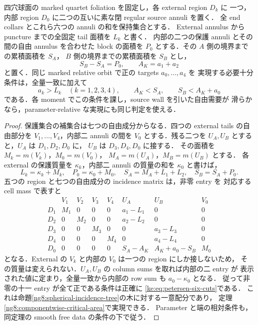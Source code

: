 \begin{proposition}
\label{ke:petersen-two-end-cuts}
四穴球面の marked quartet foliation を固定し，各 external region $D_k$ に
一つ，内部 region $D_0$ に二つの互いに素な閉 regular source annuli を置く．
全 end collars とこれら六つの annuli の和を保持集合とする．
External annulus から puncture までの全固定 tail 面積を $L_k$ と書く．
内部の二つの保護 annuli とその間の自由 annulus を合わせた block の面積を
$P_0$ とする．その $A$ 側の境界までの累積面積を $S_A$，
$B$ 側の境界までの累積面積を $S_B$ とし，
\[
 S_B-S_A=P_0,\qquad A_K=a_1+a_2
\]
と置く．同じ marked relative orbit で正の targets $a_0,\ldots,a_4$ を
実現する必要十分条件は，全量一致に加えて
\begin{equation}\label{ke:eq:petersen-six-cuts}
 a_k>L_k\quad(k=1,2,3,4),\qquad
 A_K<S_A,\qquad S_B<A_K+a_0
\end{equation}
である．各 moment でこの条件を課し，source wall を引いた自由需要が
滑らかなら，parameter-relative な実現にも同じ判定を使える．
\end{proposition}

\begin{proof}
保護集合の補集合は七つの自由成分からなる．四つの external tails の自由部分を
$V_1,\ldots,V_4$，内部二 annuli の間を $V_0$ とする．残る二つを
$U_A,U_B$ とすると，$U_A$ は $D_1,D_2,D_0$ に，
$U_B$ は $D_3,D_4,D_0$ に接する．
その面積を $M_k=m(V_k)$，$M_0=m(V_0)$，
$M_A=m(U_A)$，$M_B=m(U_B)$ とする．
各 external の保護質量を $\kappa_k$，内部二 annuli の質量の和を
$\kappa_0$ と書けば，
\[
 L_k=\kappa_k+M_k,\quad P_0=\kappa_0+M_0,\quad
 S_A=M_A+L_1+L_2,\quad S_B=S_A+P_0 .
\]
五つの region と七つの自由成分の incidence matrix は，非零 entry を
対応する cell mass で表すと
\[
\begin{array}{c|ccccccc}
 &V_1&V_2&V_3&V_4&U_A&U_B&V_0\\ \hline
 D_1&M_1&0&0&0&a_1-L_1&0&0\\
 D_2&0&M_2&0&0&a_2-L_2&0&0\\
 D_3&0&0&M_3&0&0&a_3-L_3&0\\
 D_4&0&0&0&M_4&0&a_4-L_4&0\\
 D_0&0&0&0&0&S_A-A_K&A_K+a_0-S_B&M_0
\end{array}
\]
となる．External の $V_k$ と内部の $V_0$ は一つの region にしか接しないため，
その質量は変えられない．$U_A,U_B$ の column sums を取れば内部の二 entry が
表示された値に定まり，全量一致から内部の row sum も $a_0-\kappa_0$ となる．
従って非零の十一 entry が全て正である条件は正確に
\eqref{ke:eq:petersen-six-cuts}である．
これは命題\ref{ng8:spherical-incidence-tree}の木に対する一意配分であり，
定理\ref{ng8:componentwise-critical-area}で実現できる．
Parameter と端の相対条件も，同定理の smooth free data の条件の下で従う．
\end{proof}


